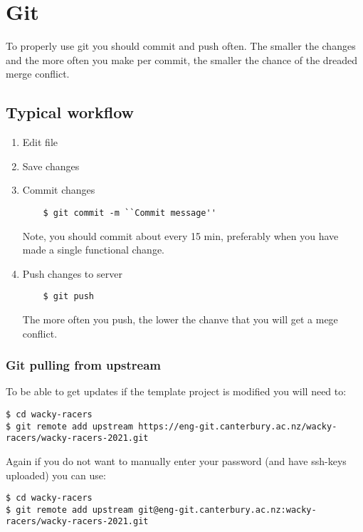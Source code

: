 \chapter{Git}
\label{git}

To properly use git you should commit and push often. The smaller the
changes and the more often you make per commit, the smaller the chance
of the dreaded merge conflict.


\section{Typical workflow}

\begin{enumerate}
\item Edit file

\item Save changes  

\item Commit changes 

\begin{verbatim}  
    $ git commit -m ``Commit message''
\end{verbatim}

Note, you should commit about every 15 min, preferably when you have
made a single functional change.
  
\item Push changes to server

\begin{verbatim}    
    $ git push
\end{verbatim}

The more often you push, the lower the chanve that you will get a mege
conflict.
  
\end{enumerate}


\subsection{Git pulling from upstream}
\label{git-pulling-from-upstream}

To be able to get updates if the template project is modified you will
need to:

\begin{verbatim}
$ cd wacky-racers 
$ git remote add upstream https://eng-git.canterbury.ac.nz/wacky-racers/wacky-racers-2021.git  
\end{verbatim}

Again if you do not want to manually enter your password (and have
ssh-keys uploaded) you can use:
%
\begin{verbatim}
$ cd wacky-racers 
$ git remote add upstream git@eng-git.canterbury.ac.nz:wacky-racers/wacky-racers-2021.git
\end{verbatim}


